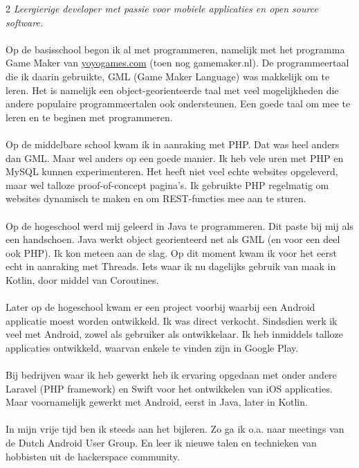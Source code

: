 \documentclass[10pt,a4paper]{article}
\begin{document}
\vspace{-1.3em}  %
\begin{multicols}{2}  %
\noindent \emph{Leergierige developer met passie voor mobiele applicaties en open source software.}
\\
\\
Op de basisschool begon ik al met programmeren, namelijk met het programma Game Maker van \href{http://www.yoyogames.com}{yoyogames.com} (toen nog gamemaker.nl). De programmeertaal die ik daarin gebruikte, GML (Game Maker Language) was makkelijk om te leren. Het is namelijk een object-georienteerde taal met veel mogelijkheden die andere populaire programmeertalen ook ondersteunen. Een goede taal om mee te leren en te beginen met programmeren.
\\
\\
Op de middelbare school kwam ik in aanraking met PHP. Dat was heel anders dan GML. Maar wel anders op een goede manier. Ik heb vele uren met PHP en MySQL kunnen experimenteren. Het heeft niet veel echte websites opgeleverd, maar wel talloze proof-of-concept pagina's. Ik gebruikte PHP regelmatig om websites dynamisch te maken en om REST-functies mee aan te sturen.
\\
\\
Op de hogeschool werd mij geleerd in Java te programmeren. Dit paste bij mij als een handschoen. Java werkt object georienteerd net als GML (en voor een deel ook PHP). Ik kon meteen aan de slag. Op dit moment kwam ik voor het eerst echt in aanraking met Threads. Iets waar ik nu dagelijks gebruik van maak in Kotlin, door middel van Coroutines.
\\
\\
Later op de hogeschool kwam er een project voorbij waarbij een Android applicatie moest worden ontwikkeld. Ik was direct verkocht.
Sindsdien werk ik veel met Android, zowel als gebruiker als ontwikkelaar.
Ik heb inmiddels talloze applicaties ontwikkeld, waarvan enkele te vinden zijn in Google Play.
\\
\\
Bij bedrijven waar ik heb gewerkt heb ik ervaring opgedaan met onder andere Laravel (PHP framework) en Swift voor het ontwikkelen van iOS applicaties. Maar voornamelijk gewerkt met Android, eerst in Java, later in Kotlin. 
\\
\\
In mijn vrije tijd ben ik steeds aan het bijleren. Zo ga ik o.a. naar meetings van de Dutch Android User Group. En leer ik nieuwe talen en technieken van hobbisten uit de hackerspace community.
\end{multicols}
\end{document}
